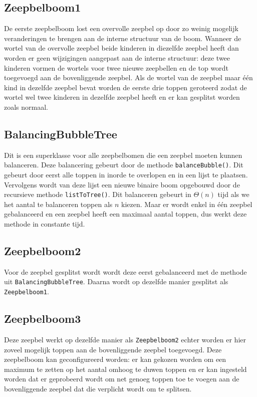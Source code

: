 \documentclass[12pt]{article}
\begin{document}
    \subsection{Zeepbelboom1}
    De eerste zeepbelboom  lost een overvolle zeepbel op door zo weinig mogelijk
    veranderingen te brengen aan de interne structuur van de boom. Wanneer de wortel van
    de overvolle zeepbel beide kinderen in diezelfde zeepbel heeft dan worden er geen
    wijzigingen aangepast aan de interne structuur: deze twee kinderen vormen de wortels
    voor twee nieuwe zeepbellen en de top wordt toegevoegd aan de bovenliggende zeepbel.
    Als de wortel van de zeepbel maar één kind in dezelfde zeepbel bevat worden de
    eerste drie toppen geroteerd zodat de wortel wel twee kinderen in dezelfde zeepbel
    heeft en er kan gesplitst worden zoals normaal.
    \subsection{BalancingBubbleTree}
    Dit is een superklasse voor alle zeepbelbomen die een zeepbel moeten kunnen balanceren.
    Deze balancering gebeurt door de methode {\tt balanceBubble()}. Dit gebeurt door eerst 
    alle toppen in inorde te overlopen en in een lijst te plaatsen.
    Vervolgens wordt van deze lijst een nieuwe binaire boom opgebouwd door de recursieve
    methode {\tt listToTree()}. Dit balanceren gebeurt in $\Theta (n)$ tijd als we het
    aantal te balanceren toppen als $n$ kiezen. Maar er wordt enkel in één zeepbel
    gebalanceerd en een zeepbel heeft een maximaal aantal toppen, dus werkt deze methode
    in constante tijd.   
    \subsection{Zeepbelboom2}
    Voor de zeepbel gesplitst wordt wordt deze eerst gebalanceerd met de methode
    uit {\tt BalancingBubbleTree}. Daarna wordt op dezelfde manier gesplitst als
    {\tt Zeepbelboom1}.
    \subsection{Zeepbelboom3}
    Deze zeepbel werkt op dezelfde manier als {\tt Zeepbelboom2} echter worden er hier
    zoveel mogelijk toppen aan de bovenliggende zeepbel toegevoegd. Deze zeepbelboom
    kan geconfigureerd worden: er kan gekozen worden om een maximum te zetten op het 
    aantal omhoog te duwen toppen en er kan ingesteld worden dat er geprobeerd wordt
    om net genoeg toppen toe te voegen aan de bovenliggende zeepbel dat die verplicht
    wordt om te splitsen.  
\end{document}
